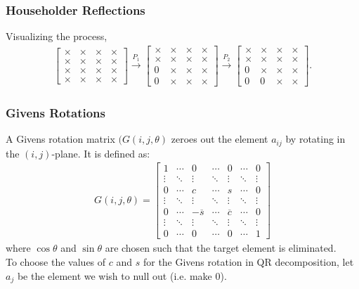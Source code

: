 \documentclass{beamer}
\theoremstyle{remark}
\numberwithin{equation}{section}
\begin{document}
    \begin{frame}
      \frametitle{Householder Reflections}
      Visualizing the process,
      \begin{align}
        \begin{bmatrix}
          \times & \times & \times & \times \\
          \times & \times & \times & \times \\
          \times & \times & \times & \times \\
          \times & \times & \times & \times
        \end{bmatrix}
        \xrightarrow{P_1}
        \begin{bmatrix}
          \times & \times & \times & \times \\
          \times & \times & \times & \times \\
          0 & \times & \times & \times \\
          0 & \times & \times & \times
        \end{bmatrix}
        \xrightarrow{P_2}
        \begin{bmatrix}
          \times & \times & \times & \times \\
          \times & \times & \times & \times \\
          0 & \times & \times & \times \\
          0 & 0 & \times & \times
        \end{bmatrix}.
      \end{align}      \end{frame}
      \begin{frame}
        \frametitle{Givens Rotations}


        A Givens rotation matrix $(G(i,j,\theta)$ zeroes out the element $a_{ij}$ by rotating in the $(i,j)$-plane. It is defined as:
        {\small
        \begin{align*}
          G(i, j, \theta) = \begin{bmatrix}
            1 & \cdots & 0 & \cdots & 0 & \cdots & 0 \\
            \vdots & \ddots & \vdots & \ddots & \vdots & \ddots & \vdots \\
            0 & \cdots & c & \cdots & s & \cdots & 0 \\
            \vdots & \ddots & \vdots & \ddots & \vdots & \ddots & \vdots \\
            0 & \cdots & -\overline{s} & \cdots & \overline{c} & \cdots & 0 \\
            \vdots & \ddots & \vdots & \ddots & \vdots & \ddots & \vdots \\
            0 & \cdots & 0 & \cdots & 0 & \cdots & 1
          \end{bmatrix}
        \end{align*}
        }
        where $\cos\theta$ and $\sin\theta$ are chosen such that the target element is eliminated.\\
      To choose the values of $c$ and $s$ for the Givens rotation in QR decomposition, let $a_j$ be the element we wish to null out (i.e. make 0).         \end{frame}
\end{document}
